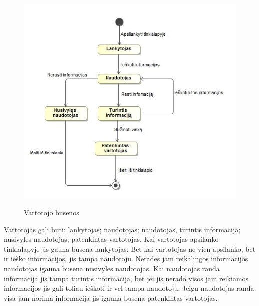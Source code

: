 ﻿\documentclass{VUMIFPSkursinis}
\begin{document}
\begin{figure}[H]
    \centering
    \includegraphics[scale=0.7]{img/geri/Vartotojas_Busenos.jpg}
    \label{img:uml19}
	\caption{Vartotojo busenos}
\end{figure}
Vartotojas gali buti: lankytojas; naudotojas; naudotojas, turintis informacija; nusivyles naudotojas; patenkintas vartotojas. Kai vartotojas apsilanko tinklalapyje jis gauna busena lankytojas. Bet kai vartotojas ne vien apsilanko, bet ir ieško informacijos, jis tampa naudotoju. Nerades jam reikalingos informacijos naudotojas igauna busena nusivyles naudotojas. Kai naudotojas randa informacija jis tampa turintis informacija, bet jei jis nerado visos jam reikiamos informacijos jis gali toliau ieškoti ir vel tampa naudotoju. Jeigu naudotojas randa visa jam norima informacija jis igauna busena patenkintas vartotojas.
\end{document}

